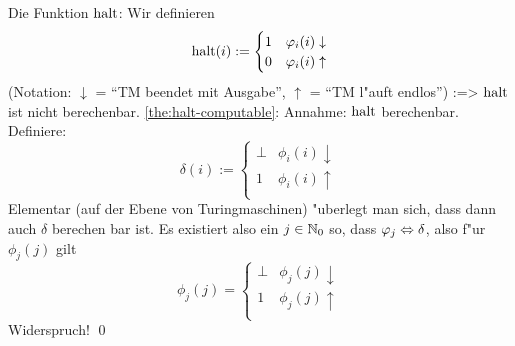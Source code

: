  Die Funktion $\operatorname{halt}$:{
  Wir definieren
  \[\operatorname{halt}(i):=\begin{cases}
      1 & \varphi_i(i)\downarrow \\
      0 & \varphi_i(i)\uparrow \\
      \end{cases}
    \]
  (Notation: $\downarrow$ = ``TM beendet mit Ausgabe'',
  $\uparrow$ = ``TM l"auft endlos'') 
  }
\theorem:=>{
  \label{the:halt-computable}
  $\operatorname{halt}$ ist nicht berechenbar.
  }
\proof \ref{the:halt-computable}:{
  Annahme: $\operatorname{halt}$ berechenbar. Definiere:
  \[\delta(i):=\begin{cases}
      \bot & \phi_i(i)\downarrow \\
      1 & \phi_i(i)\uparrow \\
      \end{cases}
    \]
  Elementar (auf der Ebene von Turingmaschinen) "uberlegt man sich,
  dass dann auch $\delta$ berechen bar ist.
  Es existiert also ein $j\in\mathbb N_0$ so, dass $\phi_j\ident\delta$,
  also f"ur $\phi_j(j)$ gilt 
  \[\phi_j(j)=\begin{cases}
      \bot & \phi_j(j) \downarrow\\
      1 & \phi_j(j)\uparrow \\
      \end{cases}
    \]
  Widerspruch! \qed
  }
